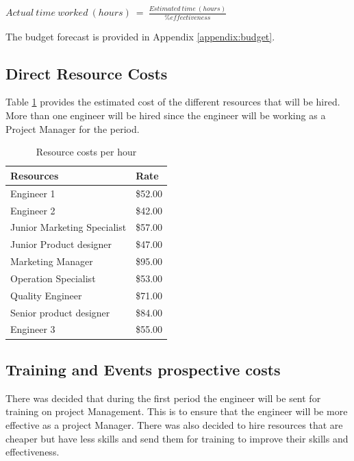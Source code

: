 \begin{center}
$ Actual\ time\ worked\ (hours)\ =\ \frac{Estimated\ time\ (hours)}{\% effectiveness} $
\end{center}

\noindent
The budget forecast is provided in Appendix \ref{appendix:budget}.

\subsection{Direct Resource Costs}

Table \ref{tab:resourcecosts} provides the estimated cost of the different resources that will be hired. More than one engineer will be hired since the engineer will be working as a Project Manager for the period.

\begin{table}[H]
\centering
\caption{Resource costs per hour}
\label{tab:resourcecosts}
\begin{tabular}{ll}
\textbf{Resources}          & \textbf{Rate} \\\hline
Engineer 1                  & \$52.00       \\
Engineer 2                  & \$42.00       \\
Junior Marketing Specialist & \$57.00       \\
Junior Product designer     & \$47.00       \\
Marketing Manager           & \$95.00       \\
Operation Specialist        & \$53.00       \\
Quality Engineer            & \$71.00       \\
Senior product designer     & \$84.00       \\
Engineer 3                  & \$55.00      
\end{tabular}
\end{table}

\subsection{Training and Events prospective costs}

There was decided that during the first period the engineer will be sent for training on project Management. This is to ensure that the engineer will be more effective as a project Manager. There was also decided to hire resources that are cheaper but have less skills and send them for training to improve their skills and effectiveness.\\

